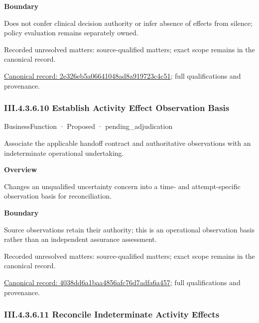 \textbf{Boundary}



Does not confer clinical decision authority or infer absence of effects from silence; policy evaluation remains separately owned.


{\small Recorded unresolved matters: source-qualified matters; exact scope remains in the canonical record.}\par
{\footnotesize \href{../../../../../../../../continuum/business/business-function/2e326eb5a06641048ad8a919723c4c51.md}{Canonical record: 2e326eb5a06641048ad8a919723c4c51}; full qualifications and provenance.}\par
\subsubsection*{III.4.3.6.10 Establish Activity Effect Observation Basis}
\label{navigation:III.4.3.6.10}

\label{element:4038dd6a1baa4856afc76d7adfa6a457}
{\small BusinessFunction · Proposed · pending\_adjudication}\par

Associate the applicable handoff contract and authoritative observations with an indeterminate operational undertaking.



\textbf{Overview}



Changes an unqualified uncertainty concern into a time- and attempt-specific observation basis for reconciliation.



\textbf{Boundary}



Source observations retain their authority; this is an operational observation basis rather than an independent assurance assessment.


{\small Recorded unresolved matters: source-qualified matters; exact scope remains in the canonical record.}\par
{\footnotesize \href{../../../../../../../../continuum/business/business-function/4038dd6a1baa4856afc76d7adfa6a457.md}{Canonical record: 4038dd6a1baa4856afc76d7adfa6a457}; full qualifications and provenance.}\par
\subsubsection*{III.4.3.6.11 Reconcile Indeterminate Activity Effects}
\label{navigation:III.4.3.6.11}

